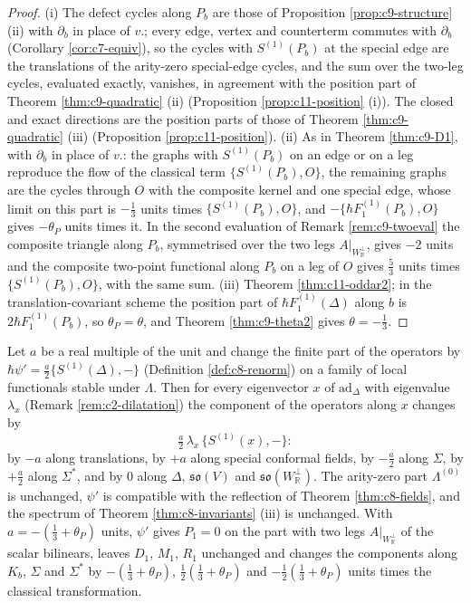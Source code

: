 \begin{proof}
(i) The defect cycles along $P_b$ are those of Proposition \ref{prop:c9-structure} (ii) with $\partial_b$ in place of $v.$; every edge, vertex and counterterm commutes with $\partial_b$ (Corollary \ref{cor:c7-equiv}), so the cycles with $S^{(1)}(P_b)$ at the special edge are the translations of the arity-zero special-edge cycles, and the sum over the two-leg cycles, evaluated exactly, vanishes, in agreement with the position part of Theorem \ref{thm:c9-quadratic} (ii) (Proposition \ref{prop:c11-position} (i)). The closed and exact directions are the position parts of those of Theorem \ref{thm:c9-quadratic} (iii) (Proposition \ref{prop:c11-position}). (ii) As in Theorem \ref{thm:c9-D1}, with $\partial_b$ in place of $v.$: the graphs with $S^{(1)}(P_b)$ on an edge or on a leg reproduce the flow of the classical term $\{S^{(1)}(P_b),O\}$, the remaining graphs are the cycles through $O$ with the composite kernel and one special edge, whose limit on this part is $-\tfrac13$ units times $\{S^{(1)}(P_b),O\}$, and $-\{\hbar F_1^{(1)}(P_b),O\}$ gives $-\theta_P$ units times it. In the second evaluation of Remark \ref{rem:c9-twoeval} the composite triangle along $P_b$, symmetrised over the two legs $A|_{W_{\mathbb R}^\perp}$, gives $-2$ units and the composite two-point functional along $P_b$ on a leg of $O$ gives $\tfrac53$ units times $\{S^{(1)}(P_b),O\}$, with the same sum. (iii) Theorem \ref{thm:c11-oddar2}; in the translation-covariant scheme the position part of $\hbar F_1^{(1)}(\Delta)$ along $b$ is $2\hbar F_1^{(1)}(P_b)$, so $\theta_P=\theta$, and Theorem \ref{thm:c9-theta2} gives $\theta=-\tfrac13$.
\end{proof}

\begin{proposition}
\label{prop:c9-scheme}
Let $a$ be a real multiple of the unit and change the finite part of the operators by $\hbar\psi'=\tfrac a2\{S^{(1)}(\Delta),-\}$ (Definition \ref{def:c8-renorm}) on a family of local functionals stable under $\Lambda$. Then for every eigenvector $x$ of $\mathrm{ad}_\Delta$ with eigenvalue $\lambda_x$ (Remark \ref{rem:c2-dilatation}) the component of the operators along $x$ changes by
\[
\tfrac a2\,\lambda_x\,\{S^{(1)}(x),-\}:
\]
by $-a$ along translations, by $+a$ along special conformal fields, by $-\tfrac a2$ along $\Sigma$, by $+\tfrac a2$ along $\Sigma^*$, and by $0$ along $\Delta$, $\mathfrak{so}(V)$ and $\mathfrak{so}(W_{\mathbb R}^\perp)$. The arity-zero part $\Lambda^{(0)}$ is unchanged, $\psi'$ is compatible with the reflection of Theorem \ref{thm:c8-fields}, and the spectrum of Theorem \ref{thm:c8-invariants} (iii) is unchanged. With $a=-(\tfrac13+\theta_P)$ units, $\psi'$ gives $P_1=0$ on the part with two legs $A|_{W_{\mathbb R}^\perp}$ of the scalar bilinears, leaves $D_1$, $M_1$, $R_1$ unchanged and changes the components along $K_b$, $\Sigma$ and $\Sigma^*$ by $-(\tfrac13+\theta_P)$, $\tfrac12(\tfrac13+\theta_P)$ and $-\tfrac12(\tfrac13+\theta_P)$ units times the classical transformation.
\end{proposition}

